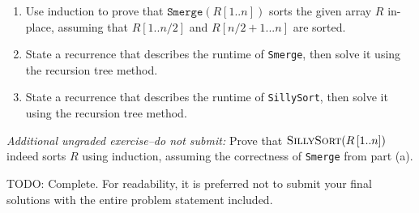 \documentclass[11pt]{article}
\begin{document}
\begin{question}
    \begin{enumerate}[label = (\alph*)]
    \item Use induction to prove that $\texttt{Smerge}(R[1..n])$ sorts the given array $R$ in-place, assuming that $R[1..n/2]$ and $R[n/2+1...n]$ are sorted. 
    
    \item State a recurrence that describes the runtime of \texttt{Smerge}, then solve it using the recursion tree method.
    
    \item State a recurrence that describes the runtime of \texttt{SillySort}, then solve it using the recursion tree method.

    \end{enumerate}

\emph{Additional ungraded exercise--do not submit:} Prove that $\textsc{SillySort}(R\left[ 1..n \right])$ indeed sorts $R$ using induction, assuming the correctness of \texttt{Smerge} from part (a).

\begin{solution}
TODO: Complete. For readability, it is preferred not to submit your final solutions with the entire problem statement included.
\end{solution}

\end{question}

\end{document}
